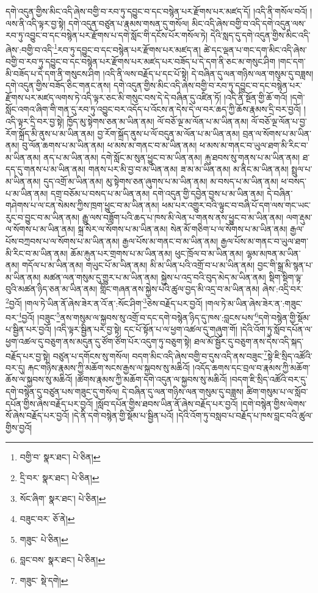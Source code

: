 དགེ་འདུན་གྱིས་མིང་འདི་ཞེས་བགྱི་བ་རབ་ཏུ་དབྱུང་བ་དང་བསྙེན་པར་རྫོགས་པར་མཛད་དོ། །འདི་ནི་གསོལ་བའོ། །ལས་ནི་འདི་ལྟར་བྱ་སྟེ། དགེ་འདུན་བཙུན་པ་རྣམས་གསན་དུ་གསོལ། མིང་འདི་ཞེས་བགྱི་བ་འདི་དགེ་འདུན་ལས་རབ་ཏུ་འབྱུང་བ་དང་བསྙེན་པར་རྫོགས་པ་དགེ་སློང་གི་དངོས་པོར་གསོལ་ཏེ། དེའི་སླད་དུ་དགེ་འདུན་གྱིས་མིང་འདི་ཞེས་:བགྱི་བ་འདི་\footnote{བགྱི་བ་  སྣར་ཐང་།  པེ་ཅིན། }རབ་ཏུ་དབྱུང་བ་དང་བསྙེན་པར་རྫོགས་པར་མཛད་ན། ཚེ་དང་ལྡན་པ་གང་དག་མིང་འདི་ཞེས་བགྱི་བ་རབ་ཏུ་དབྱུང་བ་དང་བསྙེན་པར་རྫོགས་པར་མཛད་པར་བཟོད་པ་དེ་དག་ནི་ཅང་མ་གསུང་ཤིག །གང་དག་མི་བཟོད་པ་དེ་དག་ནི་གསུངས་ཤིག །འདི་ནི་ལས་བརྗོད་པ་དང་པོ་སྟེ། དེ་བཞིན་དུ་ལན་གཉིས་ལན་གསུམ་དུ་བཟླས། དགེ་འདུན་གྱིས་བཟོད་ཅིང་གནང་ནས། དགེ་འདུན་གྱིས་མིང་འདི་ཞེས་བགྱི་བ་རབ་ཏུ་དབྱུང་བ་དང་བསྙེན་པར་རྫོགས་པར་མཛད་ལགས་ཏེ་འདི་ལྟར་ཅང་མི་གསུང་བས་དེ་དེ་བཞིན་དུ་འཛིན་ཏོ། །འདི་ནི་སྔོན་གྱི་ཆོ་གའོ། །དགེ་སློང་འགའ་ཞིག་གི་གན་དུ་རབ་ཏུ་འབྱུང་བར་འདོད་པ་འོངས་ན་དེས་དེ་ལ་བར་ཆད་ཀྱི་ཆོས་རྣམས་དྲི་བར་བྱའོ། །འདི་ལྟར་དྲི་བར་བྱ་སྟེ། ཁྱོད་མུ་སྟེགས་ཅན་མ་ཡིན་ནམ། ལོ་བཅོ་ལྔ་མ་ལོན་པ་མ་ཡིན་ནམ། ལོ་བཅོ་ལྔ་ལོན་པ་བྱ་རོག་སྐྲོད་མི་ནུས་པ་མ་ཡིན་ནམ། བྱ་རོག་སྐྲོད་ནུས་པ་ལོ་བདུན་མ་ལོན་པ་མ་ཡིན་ནམ། བྲན་ལ་སོགས་པ་མ་ཡིན་ནམ། བུ་ལོན་ཆགས་པ་མ་ཡིན་ནམ། ཕ་མས་མ་གནང་བ་མ་ཡིན་ནམ། ཕ་མས་མ་གནང་བ་ཡུལ་ཐག་མི་རིང་བ་མ་ཡིན་ནམ། ནད་པ་མ་ཡིན་ནམ། དགེ་སློང་མ་སུན་ཕྱུང་བ་མ་ཡིན་ནམ། རྐུ་ཐབས་སུ་གནས་པ་མ་ཡིན་ནམ། ཐ་དད་དུ་གནས་པ་མ་ཡིན་ནམ། གནས་པར་མི་བྱ་བ་མ་ཡིན་ནམ། ཟ་མ་མ་ཡིན་ནམ། མ་ནིང་མ་ཡིན་ནམ། སྤྲུལ་པ་མ་ཡིན་ནམ། དུད་འགྲོ་མ་ཡིན་ནམ། མུ་སྟེགས་ཅན་ཞུགས་པ་མ་ཡིན་ནམ། མ་བསད་པ་མ་ཡིན་ནམ། ཕ་བསད་པ་མ་ཡིན་ནམ། དགྲ་བཅོམ་པ་བསད་པ་མ་ཡིན་ནམ། དགེ་འདུན་གྱི་དབྱེན་བྱས་པ་མ་ཡིན་ནམ། དེ་བཞིན་གཤེགས་པ་ལ་ངན་སེམས་ཀྱིས་ཁྲག་ཕྱུང་བ་མ་ཡིན་ནམ། ཕམ་པར་འགྱུར་བའི་ལྟུང་བ་བཞི་པོ་དག་ལས་གང་ཡང་རུང་བ་བྱུང་བ་མ་ཡིན་ནམ། རྒྱུ་ལས་བཟློག་པའི་ཆད་པ་ཁས་མི་ལེན་པ་གནས་ནས་ཕྱུང་བ་མ་ཡིན་ནམ། ལག་རྡུམ་ལ་སོགས་པ་མ་ཡིན་ནམ། སྐྲ་སེར་ལ་སོགས་པ་མ་ཡིན་ནམ། སེན་མོ་གཅིག་པ་ལ་སོགས་པ་མ་ཡིན་ནམ། རྒྱལ་པོས་བཀྲབས་པ་ལ་སོགས་པ་མ་ཡིན་ནམ། རྒྱལ་པོས་མ་གནང་བ་མ་ཡིན་ནམ། རྒྱལ་པོས་མ་གནང་བ་ཡུལ་ཐག་མི་རིང་བ་མ་ཡིན་ནམ། ཆོམ་རྐུན་པར་གྲགས་པ་མ་ཡིན་ནམ། ཕུང་ཁྲོལ་བ་མ་ཡིན་ནམ། ལྷམ་མཁན་མ་ཡིན་ནམ། གདོལ་པ་མ་ཡིན་ནམ། གཡུང་པོ་མ་ཡིན་ནམ། མི་མ་ཡིན་པའི་འགྲོ་བ་པ་མ་ཡིན་ནམ། བྱང་གི་སྒྲ་མི་སྙན་པ་མ་ཡིན་ནམ། མཚན་ལན་གསུམ་དུ་གྱུར་པ་མ་ཡིན་ནམ། སྐྱེས་པ་འདྲ་བའི་བུད་མེད་མ་ཡིན་ནམ། སྡིག་སྡིག་ལྟ་བུའི་མཚན་ཉིད་ཅན་མ་ཡིན་ནམ། གླིང་གཞན་ནས་སྐྱེས་པའི་ཚུལ་བྱད་མི་འདྲ་བ་མ་ཡིན་ནམ། ཞེས་:འདྲི་བར་\footnote{དྲི་བར་  སྣར་ཐང་།  པེ་ཅིན། }བྱའོ། །གལ་ཏེ་ཡིན་ནོ་ཞེས་ཟེར་ན་འོ་ན་:སོང་ཤིག་\footnote{སོང་ཞིག་  སྣར་ཐང་།  པེ་ཅིན། }ཅེས་བརྗོད་པར་བྱའོ། །གལ་ཏེ་མ་ཡིན་ཞེས་ཟེར་ན་:གཟུང་བར་\footnote{བཟུང་བར་  ཅོ་ནེ། }བྱའོ། །བཟུང་\footnote{གཟུང་  པེ་ཅིན། }ནས་གསུམ་ལ་སྐྱབས་སུ་འགྲོ་བ་དང་དགེ་བསྙེན་ཉིད་དུ་ཁས་:བླངས་པས་\footnote{བླང་བས་  སྣར་ཐང་།  པེ་ཅིན། }དགེ་བསྙེན་གྱི་སྡོམ་པ་སྦྱིན་པར་བྱའོ། །འདི་ལྟར་སྦྱིན་པར་བྱ་སྟེ། དང་པོ་སྟོན་པ་ལ་ཕྱག་འཚལ་དུ་གཞུག་གོ། །དེའི་འོག་ཏུ་སློབ་དཔོན་ལ་ཕྱག་འཚལ་དུ་བཅུག་ནས་མདུན་དུ་ཙོག་ཙོག་པོར་འདུག་ཏུ་བཅུག་སྟེ། ཐལ་མོ་སྦྱོར་དུ་བཅུག་ནས་དེས་འདི་སྐད་བརྗོད་པར་བྱ་སྟེ། བཙུན་པ་དགོངས་སུ་གསོལ། བདག་མིང་འདི་ཞེས་བགྱི་བ་དུས་འདི་ནས་བཟུང་\footnote{གཟུང་  སྡེ་དགེ། }སྟེ་ཇི་སྲིད་འཚོའི་བར་དུ། རྐང་གཉིས་རྣམས་ཀྱི་མཆོག་སངས་རྒྱས་ལ་སྐྱབས་སུ་མཆིའོ། །འདོད་ཆགས་དང་བྲལ་བ་རྣམས་ཀྱི་མཆོག་ཆོས་ལ་སྐྱབས་སུ་མཆིའོ། །ཚོགས་རྣམས་ཀྱི་མཆོག་དགེ་འདུན་ལ་སྐྱབས་སུ་མཆིའོ། །བདག་ཇི་སྲིད་འཚོའི་བར་དུ་དགེ་བསྙེན་དུ་བཙུན་པས་གཟུང་དུ་གསོལ། དེ་བཞིན་དུ་ལན་གཉིས་ལན་གསུམ་དུ་བཟླས། ཚིག་གསུམ་པ་ལ་སློབ་དཔོན་གྱིས་ཞེས་བརྗོད་པར་བྱའོ། །སློབ་དཔོན་གྱིས་ཐབས་ཡིན་ནོ་ཞེས་བརྗོད་པར་བྱའོ། །དགེ་བསྙེན་གྱིས་ལེགས་སོ་ཞེས་བརྗོད་པར་བྱའོ། །དེ་ནི་དགེ་བསྙེན་གྱི་སྡོམ་པ་སྦྱིན་པའོ། །དེའི་འོག་ཏུ་བསླབ་པ་བརྗོད་པ་ཁས་བླང་བའི་ཚུལ་གྱིས་བྱའོ། 
